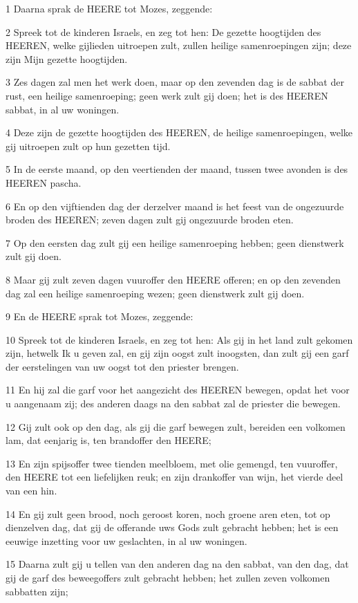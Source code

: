 \par 1 Daarna sprak de HEERE tot Mozes, zeggende:
\par 2 Spreek tot de kinderen Israels, en zeg tot hen: De gezette hoogtijden des HEEREN, welke gijlieden uitroepen zult, zullen heilige samenroepingen zijn; deze zijn Mijn gezette hoogtijden.
\par 3 Zes dagen zal men het werk doen, maar op den zevenden dag is de sabbat der rust, een heilige samenroeping; geen werk zult gij doen; het is des HEEREN sabbat, in al uw woningen.
\par 4 Deze zijn de gezette hoogtijden des HEEREN, de heilige samenroepingen, welke gij uitroepen zult op hun gezetten tijd.
\par 5 In de eerste maand, op den veertienden der maand, tussen twee avonden is des HEEREN pascha.
\par 6 En op den vijftienden dag der derzelver maand is het feest van de ongezuurde broden des HEEREN; zeven dagen zult gij ongezuurde broden eten.
\par 7 Op den eersten dag zult gij een heilige samenroeping hebben; geen dienstwerk zult gij doen.
\par 8 Maar gij zult zeven dagen vuuroffer den HEERE offeren; en op den zevenden dag zal een heilige samenroeping wezen; geen dienstwerk zult gij doen.
\par 9 En de HEERE sprak tot Mozes, zeggende:
\par 10 Spreek tot de kinderen Israels, en zeg tot hen: Als gij in het land zult gekomen zijn, hetwelk Ik u geven zal, en gij zijn oogst zult inoogsten, dan zult gij een garf der eerstelingen van uw oogst tot den priester brengen.
\par 11 En hij zal die garf voor het aangezicht des HEEREN bewegen, opdat het voor u aangenaam zij; des anderen daags na den sabbat zal de priester die bewegen.
\par 12 Gij zult ook op den dag, als gij die garf bewegen zult, bereiden een volkomen lam, dat eenjarig is, ten brandoffer den HEERE;
\par 13 En zijn spijsoffer twee tienden meelbloem, met olie gemengd, ten vuuroffer, den HEERE tot een liefelijken reuk; en zijn drankoffer van wijn, het vierde deel van een hin.
\par 14 En gij zult geen brood, noch geroost koren, noch groene aren eten, tot op dienzelven dag, dat gij de offerande uws Gods zult gebracht hebben; het is een eeuwige inzetting voor uw geslachten, in al uw woningen.
\par 15 Daarna zult gij u tellen van den anderen dag na den sabbat, van den dag, dat gij de garf des beweegoffers zult gebracht hebben; het zullen zeven volkomen sabbatten zijn;
